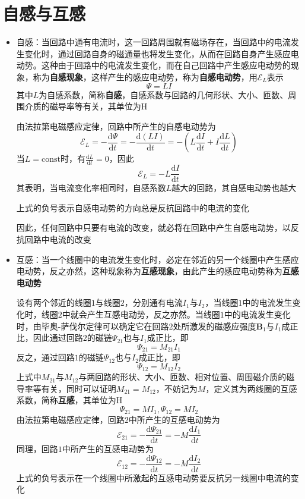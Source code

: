 \documentclass[12pt, a4paper, twoside]{ctexbook}
\begin{document}
\section{自感与互感}
\begin{itemize}
    \item {\sonti 自感}：当回路中通有电流时，这一回路周围就有磁场存在，当回路中的电流发生变化时，通过回路自身的磁通量也将发生变化，从而在回路自身产生感应电动势。这种由于回路中的电流发生变化，而在自己回路中产生感应电动势的现象，称为\textbf{自感现象}，这样产生的感应电动势，称为\textbf{自感电动势}，用$\mathscr{E}_L$表示
    $$
    \varPsi=LI
    $$
    其中$L$为自感系数，简称\textbf{自感}，自感系数与回路的几何形状、大小、匝数、周围介质的磁导率等有关，其单位为$\mathrm{H}$

    由法拉第电磁感应定律，回路中所产生的自感电动势为
    $$
    \mathscr{E}_L=-\frac{\mathrm{d}\varPsi}{\mathrm{d}t}=-\frac{\mathrm{d}\left(LI\right)}{\mathrm{d}t}=-\left(L\frac{\mathrm{d}I}{\mathrm{d}t}+I\frac{\mathrm{d}L}{\mathrm{d}t}\right)
    $$
    当$L=\mathrm{const}$时，有$\frac{\mathrm{d}L}{\mathrm{d}t}=0$，因此
    $$
    \mathscr{E}_L=-L\frac{\mathrm{d}I}{\mathrm{d}t}
    $$
    其表明，当电流变化率相同时，自感系数$L$越大的回路，其自感电动势也越大

    上式的负号表示自感电动势的方向总是反抗回路中的电流的变化

    因此，任何回路中只要有电流的改变，就必将在回路中产生自感电动势，以反抗回路中电流的改变
    \item {\sonti 互感}：当一个线圈中的电流发生变化时，必定在邻近的另一个线圈中产生感应电动势，反之亦然，这种现象称为\textbf{互感现象}，由此产生的感应电动势称为\textbf{互感电动势}
    
    设有两个邻近的线圈$1$与线圈$2$，分别通有电流$I_1$与$I_2$，当线圈$1$中的电流发生变化时，线圈$2$中就会产生互感电动势，反之亦然。当线圈$1$中的电流发生变化时，由毕奥-萨伐尔定律可以确定它在回路$2$处所激发的磁感应强度$\boldsymbol{B}_1$与$I_1$成正比，因此通过回路$2$的磁链$\varPsi_{21}$也与$I_1$成正比，即
    $$
    \varPsi_{21}=M_{21}I_1
    $$
    反之，通过回路$1$的磁链$\varPsi_{12}$也与$I_2$成正比，即
    $$
    \varPsi_{12}=M_{12}I_2
    $$
    上式中$M_{21}$与$M_{12}$与两回路的形状、大小、匝数、相对位置、周围磁介质的磁导率等有关，同时可以证明$M_{21}=M_{12}$，不妨记为$M$，定义其为两线圈的互感系数，简称\textbf{互感}，其单位为$\mathrm{H}$
    $$
    \varPsi_{21}=MI_1,\varPsi_{12}=MI_2
    $$
    由法拉第电磁感应定律，回路$2$中所产生的互感电动势为
    $$
    \mathscr{E}_{21}=-\frac{\mathrm{d}\varPsi_{21}}{\mathrm{d}t}=-M\frac{\mathrm{d}I_1}{\mathrm{d}t}
    $$
    同理，回路$1$中所产生的互感电动势为
    $$
    \mathscr{E}_{12}=-\frac{\mathrm{d}\varPsi_{12}}{\mathrm{d}t}=-M\frac{\mathrm{d}I_2}{\mathrm{d}t}
    $$
    上式的负号表示在一个线圈中所激起的互感电动势要反抗另一线圈中电流的变化
\end{itemize}
\end{document}
